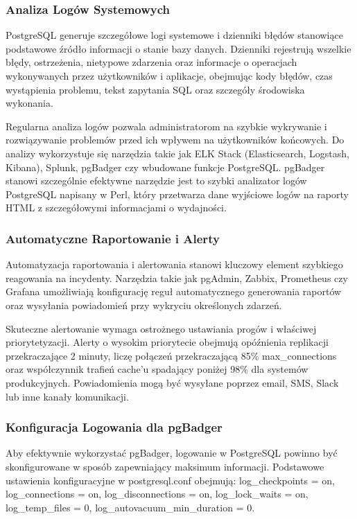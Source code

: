 \documentclass[a4paper,11pt,openany,english]{sphinxmanual}
\begin{document}
\subsubsection{Analiza Logów Systemowych}
\label{\detokenize{rozdzial2/Monitorowanie-i-diagnostyka/index:analiza-logow-systemowych}}
\sphinxAtStartPar
PostgreSQL generuje szczegółowe logi systemowe i dzienniki błędów stanowiące podstawowe źródło informacji o stanie bazy danych. Dzienniki rejestrują wszelkie błędy, ostrzeżenia, nietypowe zdarzenia oraz informacje o operacjach wykonywanych przez użytkowników i aplikacje, obejmując kody błędów, czas wystąpienia problemu, tekst zapytania SQL oraz szczegóły środowiska wykonania.

\sphinxAtStartPar
Regularna analiza logów pozwala administratorom na szybkie wykrywanie i rozwiązywanie problemów przed ich wpływem na użytkowników końcowych. Do analizy wykorzystuje się narzędzia takie jak ELK Stack (Elasticsearch, Logstash, Kibana), Splunk, pgBadger czy wbudowane funkcje PostgreSQL. pgBadger stanowi szczególnie efektywne narzędzie \sphinxhyphen{} jest to szybki analizator logów PostgreSQL napisany w Perl, który przetwarza dane wyjściowe logów na raporty HTML z szczegółowymi informacjami o wydajności.


\subsubsection{Automatyczne Raportowanie i Alerty}
\label{\detokenize{rozdzial2/Monitorowanie-i-diagnostyka/index:automatyczne-raportowanie-i-alerty}}
\sphinxAtStartPar
Automatyzacja raportowania i alertowania stanowi kluczowy element szybkiego reagowania na incydenty. Narzędzia takie jak pgAdmin, Zabbix, Prometheus czy Grafana umożliwiają konfigurację reguł automatycznego generowania raportów oraz wysyłania powiadomień przy wykryciu określonych zdarzeń.

\sphinxAtStartPar
Skuteczne alertowanie wymaga ostrożnego ustawiania progów i właściwej priorytetyzacji. Alerty o wysokim priorytecie obejmują opóźnienia replikacji przekraczające 2 minuty, liczę połączeń przekraczającą 85\% max\_connections oraz współczynnik trafień cache’u spadający poniżej 98\% dla systemów produkcyjnych. Powiadomienia mogą być wysyłane poprzez e\sphinxhyphen{}mail, SMS, Slack lub inne kanały komunikacji.


\subsubsection{Konfiguracja Logowania dla pgBadger}
\label{\detokenize{rozdzial2/Monitorowanie-i-diagnostyka/index:konfiguracja-logowania-dla-pgbadger}}
\sphinxAtStartPar
Aby efektywnie wykorzystać pgBadger, logowanie w PostgreSQL powinno być skonfigurowane w sposób zapewniający maksimum informacji. Podstawowe ustawienia konfiguracyjne w postgresql.conf obejmują: log\_checkpoints = on, log\_connections = on, log\_disconnections = on, log\_lock\_waits = on, log\_temp\_files = 0, log\_autovacuum\_min\_duration = 0.
\end{document}
